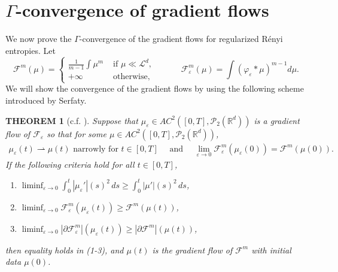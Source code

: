 \documentclass[11pt,leqno]{amsart}
\newtheorem{thm}{THEOREM}[section]
\theoremstyle{definition}
\newcommand{\R}{{\mathord{\mathbb R}}}
\newcommand{\wto}{\rightharpoonup}
\newcommand{\F}{\mathcal{F}}
\def\P{{\mathcal P}}
\def\e{\varepsilon}
\def\F{\mathcal{F}}
\begin{document}
\section{$\Gamma$-convergence of gradient flows}

We now prove the $\Gamma$-convergence of the gradient flows for regularized R\'enyi entropies. Let
\[ \F^m(\mu) = \begin{cases} \frac{1}{m-1} \int \mu^m & \text{ if } \mu \ll \mathcal{L}^d , \\ +\infty & \text{ otherwise,} \end{cases} \qquad \quad  \F^m_\e(\mu) = \int (\varphi_\e *\mu)^{m-1} d \mu . \]
We will show the convergence of the gradient flows by using the following scheme introduced by Serfaty\cite[Theorem 2]{Serfaty}.
\begin{thm}[{c.f. \cite[Theorem 2]{Serfaty}}]\label{thm:serfaty}
Suppose that $\mu_\e \in AC^2([0,T],\P_2(\R^d))$ is a gradient flow of $\F_\e$ so that for some $\mu \in AC^2([0,T],\P_2(\R^d))$,
\begin{align} \label{well prepared}  \mu_\e(t) \wto \mu(t) \text{ narrowly for }t \in [0,T] \quad \text{ and } \quad \lim_{\e \to 0} \F^m_\e(\mu_\e(0)) = \F^m(\mu(0)) .
\end{align}
If the following criteria hold for all $t \in [0,T]$,
\begin{enumerate}
	\item \label{cond:md} $\displaystyle \liminf_{\e\to 0} \int_0^t |\mu_\e'|(s)^2 \,d s \geq \int_0^t|\mu'|(s)^2\,d s$,\\
	\item \label{cond:liminf} $\displaystyle \liminf_{\e\to0} \F^m_\e(\mu_\e(t)) \geq \displaystyle \F^m(\mu(t))$,\\
	\item \label{cond:slopes} $\displaystyle \liminf_{\e\to 0} |\partial \F^m_\e|(\mu_\e(t)) \geq |\partial \F^m|(\mu(t))$,
\end{enumerate}
then equality holds in (1-3), and $\mu(t)$ is the gradient flow of $\F^m$ with initial data $\mu(0)$.
\end{thm}
\end{document}
